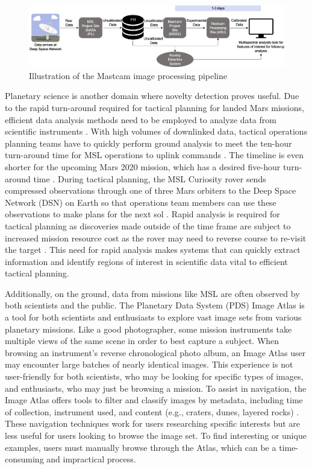 \begin{figure}
\centering
\includegraphics[width=\linewidth]{figs/msl/DSN.png}
\caption[Mastcam Image Processing Pipeline]{Illustration of the Mastcam image processing pipeline \protect\parencite{kerner2020comparison}}
\label{msl/fig:timeline}
\end{figure}

Planetary science is another domain where novelty detection proves useful. 
Due to the rapid turn-around required for tactical planning for landed Mars missions, efficient data analysis methods need to be employed to analyze data from scientific instruments \parencite{bell2019tactical}.
With high volumes of downlinked data, tactical operations planning teams have to quickly perform ground analysis to meet the ten-hour turn-around time for MSL operations to uplink commands \parencite{samuels2013preparation}. 
The timeline is even shorter for the upcoming Mars 2020 mission, which has a desired five-hour turn-around time \parencite{wilson2017nasa}.
During tactical planning, the MSL Curiosity rover sends compressed observations through one of three Mars orbiters to the Deep Space Network (DSN) on Earth so that operations team members can use these observations to make plans for the next sol \parencite{kerner_multispec}.
Rapid analysis is required for tactical planning as discoveries made outside of the time frame are subject to increased mission resource cost as the rover may need to reverse course to re-visit the target \parencite{kerner2020comparison}.
This need for rapid analysis makes systems that can quickly extract information and identify regions of interest in scientific data vital to efficient tactical planning. 

Additionally, on the ground, data from missions like MSL are often observed by both scientists and the public.
The Planetary Data System (PDS) Image Atlas is a tool for both scientists and enthusiasts to explore vast image sets from various planetary missions. 
Like a good photographer, some mission instruments take multiple views of the same scene in order to best capture a subject. 
When browsing an instrument's reverse chronological photo album, an Image Atlas user may encounter large batches of nearly identical images. 
This experience is not user-friendly for both scientists, who may be looking for specific types of images, and enthusiasts, who may just be browsing a mission. 
To assist in navigation, the Image Atlas offers tools to filter and classify images by metadata, including time of collection, instrument used, and content (e.g., craters, dunes, layered rocks) \cite{wagstaff2018deep}.
These navigation techniques work for users researching specific interests but are less useful for users looking to browse the image set. 
To find interesting or unique examples, users must manually browse through the Atlas, which can be a time-consuming and impractical process.

